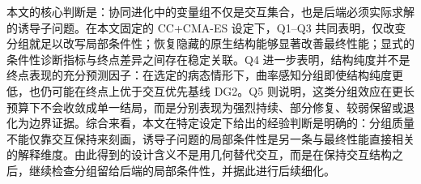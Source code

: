 本文的核心判断是：协同进化中的变量组不仅是交互集合，也是后端必须实际求解的诱导子问题。在本文固定的 CC+CMA-ES 设定下，Q1--Q3 共同表明，仅改变分组就足以改写局部条件性；恢复隐藏的原生结构能够显著改善最终性能；显式的条件性诊断指标与终点差异之间存在稳定关联。Q4 进一步表明，结构纯度并不是终点表现的充分预测因子：在选定的病态情形下，曲率感知分组即使结构纯度更低，也仍可能在终点上优于交互优先基线 DG2。Q5 则说明，这类分组效应在更长预算下不会收敛成单一结局，而是分别表现为强烈持续、部分修复、较弱保留或退化为边界证据。综合来看，本文在特定设定下给出的经验判断是明确的：分组质量不能仅靠交互保持来刻画，诱导子问题的局部条件性是另一条与最终性能直接相关的解释维度。由此得到的设计含义不是用几何替代交互，而是在保持交互结构之后，继续检查分组留给后端的局部条件性，并据此进行后续细化。
